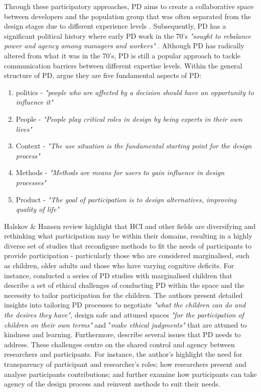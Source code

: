 Through these participatory approaches, PD aims to create a collaborative space between developers and the population group that was often separated from the design stages due to different experience levels \citep{duarte2018participatory}. Subsequently, PD has a significant political history where early PD work in the 70's \textit{"sought to rebalance power and agency among managers and workers" } \citep{bannon2018introduction}. Although PD has radically altered from what it was in the 70's, PD is still a popular approach to tackle communication barriers between different expertise levels. 
Within the general structure of PD, \cite{halskov2015diversity} argue they are five fundamental aspects of PD:
\begin{enumerate}
\item politics - \textit{"people who are affected by a decision should have an opportunity to influence it"}
\item People - \textit{"People play critical roles in design by being experts in their own lives"}
\item Context - \textit{"The use situation is the fundamental starting point for the design process"}
\item Methods - \textit{"Methods are means for users to gain influence in design processes"}
\item Product - \textit{"The goal of participation is to design alternatives, improving quality of life"}
\end{enumerate}

Halskov \& Hansen review highlight that HCI and other fields are diversifying and rethinking what participation may be within their domains, resulting in a highly diverse set of studies that reconfigure methods to fit the needs of participants to provide participation - particularly those who are considered marginalised, such as children, older adults and those who have varying cognitive deficits. For instance, \cite{spiel2018micro} conducted a series of PD studies with marginalised children that describe a set of ethical challenges of conducting PD within the space and the necessity to tailor participation for the children. The authors present detailed insights into tailoring PD processes to negotiate \textit{"what the children can do and the desires they have"}, design safe and attuned spaces \textit{"for the participation of children on their own terms"} and "\textit{make ethical judgments" }that are attuned to kindness and learning. Furthermore, \cite{vines_configuring_2013} describe several issues that PD needs to address. These challenges centre on the shared control and agency between researchers and participants. For instance, the author's highlight the need for transparency of participant and researcher's roles; how researchers present and analyse participants contributions; and further examine how participants can take agency of the design process and reinvent methods to suit their needs.

